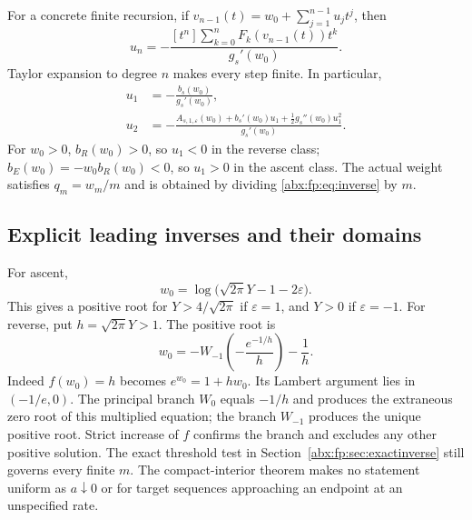 \documentclass[11pt,letterpaper]{article}
\numberwithin{equation}{section}
\theoremstyle{remark}\newtheorem{remark}[theorem]{Remark}
\newcommand{\eps}{\varepsilon}
\newcommand{\sq}{\sqrt{2\pi}}
\begin{document}
For a concrete finite recursion, if
$v_{n-1}(t)=w_0+\sum_{j=1}^{n-1}u_jt^j$, then
\begin{equation}\label{abx:fp:eq:urec}
 u_n=-\frac{[t^n]\displaystyle\sum_{k=0}^{n}
                  F_k(v_{n-1}(t))t^k}{g_s'(w_0)}.
\end{equation}
Taylor expansion to degree $n$ makes every step finite. In particular,
\begin{align}
 u_1&=-\frac{b_s(w_0)}{g_s'(w_0)},\label{abx:fp:eq:uone}\\
 u_2&=-\frac{A_{s,1,\eps}(w_0)+b_s'(w_0)u_1
                  +\tfrac12g_s''(w_0)u_1^2}{g_s'(w_0)}.
 \label{abx:fp:eq:utwo}
\end{align}
For $w_0>0$, $b_R(w_0)>0$, so $u_1<0$ in the reverse class;
$b_E(w_0)=-w_0b_R(w_0)<0$, so $u_1>0$ in the ascent class.
The actual weight satisfies $q_m=w_m/m$ and is obtained by dividing
\eqref{abx:fp:eq:inverse} by $m$.

\subsection{Explicit leading inverses and their domains}\label{abx:fp:sub:lead}
For ascent,
\begin{equation}\label{abx:fp:eq:Eleadinverse}
 w_0=\log\bigl(\sq Y-1-2\eps\bigr).
\end{equation}
This gives a positive root for $Y>4/\sq$ if $\eps=1$, and $Y>0$
if $\eps=-1$. For reverse, put $h=\sq Y>1$. The positive root is
\begin{equation}\label{abx:fp:eq:Rleadinverse}
 w_0=-W_{-1}\!\left(-\frac{e^{-1/h}}h\right)-\frac1h.
\end{equation}
Indeed $f(w_0)=h$ becomes $e^{w_0}=1+hw_0$. Its Lambert argument
lies in $(-1/e,0)$. The principal branch $W_0$ equals $-1/h$ and
produces the extraneous zero root of this multiplied equation; the
branch $W_{-1}$ produces the unique positive root. Strict increase
of $f$ confirms the branch and excludes any other positive solution.
The exact threshold test in Section~\ref{abx:fp:sec:exactinverse} still governs every finite $m$.
The compact-interior theorem makes no statement uniform as $a\downarrow0$
or for target sequences approaching an endpoint at an unspecified rate.
\end{document}
